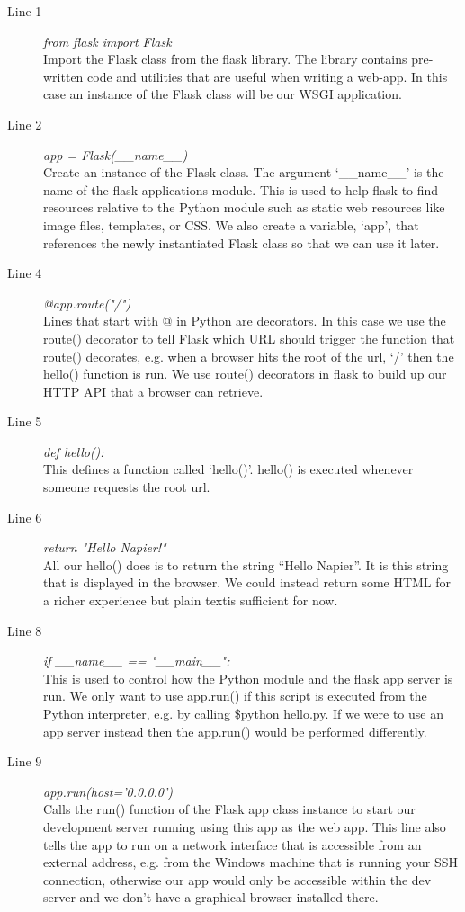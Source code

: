 \documentclass[12pt, a4paper, oneside]{book}
\begin{document}
{\begin{description}
\item[Line 1] \emph{from flask import Flask}\\ 
Import the Flask class from the flask library. The library contains pre-written code and utilities that are useful when writing a web-app. In this case an instance of the Flask class will be our WSGI application.
\item[Line 2] \emph{app = Flask(\_\_name\_\_)}\\
Create an instance of the Flask class. The argument `\_\_name\_\_' is the name of the flask applications module. This is used to help flask to find resources relative to the Python module such as static web resources like image files, templates, or CSS. We also create a variable, `app', that references the newly instantiated Flask class so that we can use it later.
\item[Line 4] \emph{@app.route("/")}\\
Lines that start with @ in Python are decorators. In this case we use the route() decorator to tell Flask which URL should trigger the function that route() decorates, e.g. when a browser hits the root of the url, `/' then the hello() function is run. We use route() decorators in flask to build up our HTTP API that a browser can retrieve.
\item[Line 5] \emph{def hello():}\\
This defines a function called `hello()'. hello() is executed whenever someone requests the root url.
\item[Line 6] \emph{return "Hello Napier!"}\\
All our hello() does is to return the string ``Hello Napier''. It is this string that is displayed in the browser. We could instead return some HTML for a richer experience but plain textis sufficient for now.
\item[Line 8] \emph{if \_\_name\_\_ == "\_\_main\_\_":}\\
This is used to control how the Python module and the flask app server is run. We only want to use app.run() if this script is executed from the Python interpreter, e.g. by calling \$python hello.py. If we were to use an app server instead then the app.run() would be performed differently.
\item[Line 9] \emph{app.run(host='0.0.0.0')
}\\
Calls the run() function of the Flask app class instance to start our development server running using this app as the web app. This line also tells the app to run on a network interface that is accessible from an external address, e.g. from the Windows machine that is running your SSH connection, otherwise our app would only be accessible within the dev server and we don't have a graphical browser installed there.
\end{description}

}
\end{document}
